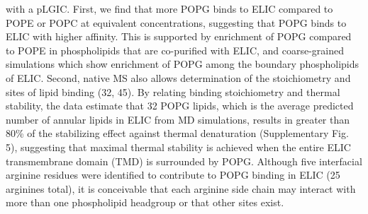 with a pLGIC. First, we find that more POPG binds to ELIC compared to
POPE or POPC at equivalent concentrations, suggesting that POPG binds to
ELIC with higher affinity. This is supported by enrichment of POPG
compared to POPE in phospholipids that are co-purified with ELIC, and
coarse-grained simulations which show enrichment of POPG among the
boundary phospholipids of ELIC. Second, native MS also allows
determination of the stoichiometry and sites of lipid binding (32, 45).
By relating binding stoichiometry and thermal stability, the data
estimate that 32 POPG lipids, which is the average predicted number of
annular lipids in ELIC from MD simulations, results in greater than 80\%
of the stabilizing effect against thermal denaturation (Supplementary
Fig. 5), suggesting that maximal thermal stability is achieved when the
entire ELIC transmembrane domain (TMD) is surrounded by POPG. Although
five interfacial arginine residues were identified to contribute to POPG
binding in ELIC (25 arginines total), it is conceivable that each
arginine side chain may interact with more than one phospholipid
headgroup or that other sites exist.

